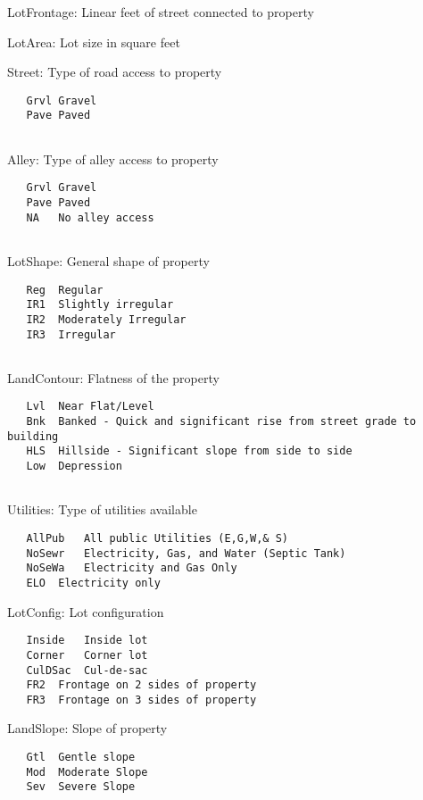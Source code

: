 \documentclass[]{article}
\begin{document}
LotFrontage: Linear feet of street connected to property

LotArea: Lot size in square feet

Street: Type of road access to property

\begin{verbatim}
   Grvl Gravel  
   Pave Paved
    
\end{verbatim}

Alley: Type of alley access to property

\begin{verbatim}
   Grvl Gravel
   Pave Paved
   NA   No alley access
    
\end{verbatim}

LotShape: General shape of property

\begin{verbatim}
   Reg  Regular 
   IR1  Slightly irregular
   IR2  Moderately Irregular
   IR3  Irregular
   
\end{verbatim}

LandContour: Flatness of the property

\begin{verbatim}
   Lvl  Near Flat/Level 
   Bnk  Banked - Quick and significant rise from street grade to building
   HLS  Hillside - Significant slope from side to side
   Low  Depression
    
\end{verbatim}

Utilities: Type of utilities available

\begin{verbatim}
   AllPub   All public Utilities (E,G,W,& S)    
   NoSewr   Electricity, Gas, and Water (Septic Tank)
   NoSeWa   Electricity and Gas Only
   ELO  Electricity only    
\end{verbatim}

LotConfig: Lot configuration

\begin{verbatim}
   Inside   Inside lot
   Corner   Corner lot
   CulDSac  Cul-de-sac
   FR2  Frontage on 2 sides of property
   FR3  Frontage on 3 sides of property
\end{verbatim}

LandSlope: Slope of property

\begin{verbatim}
   Gtl  Gentle slope
   Mod  Moderate Slope  
   Sev  Severe Slope
\end{verbatim}
\end{document}
